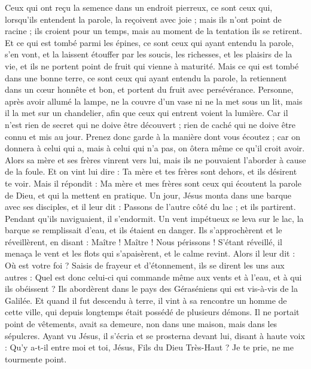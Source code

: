 \begin{multicols}{2}
Ceux qui ont reçu la semence dans un endroit pierreux, ce sont ceux qui, lorsqu’ils entendent la parole, la reçoivent avec joie ; mais ils n'ont point de racine ; ils croient pour un temps, mais au moment de la tentation ils se retirent.
Et ce qui est tombé parmi les épines, ce sont ceux qui ayant entendu la parole, s'en vont, et la laissent étouffer par les soucis, les richesses, et les plaisirs de la vie, et ils ne portent point de fruit qui vienne à maturité.
Mais ce qui est tombé dans une bonne terre, ce sont ceux qui ayant entendu la parole, la retiennent dans un cœur honnête et bon, et portent du fruit avec persévérance.
Personne, après avoir allumé la lampe, ne la couvre d'un vase ni ne la met sous un lit, mais il la met sur un chandelier, afin que ceux qui entrent voient la lumière.
Car il n’est rien de secret qui ne doive être découvert ; rien de caché qui ne doive être connu et mis au jour.
Prenez donc garde à la manière dont vous écoutez ; car on donnera à celui qui a, mais à celui qui n’a pas, on ôtera même ce qu’il croit avoir.
Alors sa mère et ses frères vinrent vers lui, mais ils ne pouvaient l'aborder à cause de la foule.
Et on vint lui dire : Ta mère et tes frères sont dehors, et ils désirent te voir.
Mais il répondit : Ma mère et mes frères sont ceux qui écoutent la parole de Dieu, et qui la mettent en pratique.
Un jour, Jésus monta dans une barque avec ses disciples, et il leur dit : Passons de l'autre côté du lac ; et ils partirent.
Pendant qu’ils naviguaient, il s'endormit. Un vent impétueux se leva sur le lac, la barque se remplissait d'eau, et ils étaient en danger.
Ils s’approchèrent et le réveillèrent, en disant : Maître ! Maître ! Nous périssons ! S’étant réveillé, il menaça le vent et les flots qui s'apaisèrent, et le calme revint.
Alors il leur dit : Où est votre foi ? Saisis de frayeur et d’étonnement, ils se dirent les uns aux autres : Quel est donc celui-ci qui commande même aux vents et à l'eau, et à qui ils obéissent ?
Ils abordèrent dans le pays des Géraséniens qui est vis-à-vis de la Galilée.
Et quand il fut descendu à terre, il vint à sa rencontre un homme de cette ville, qui depuis longtemps était possédé de plusieurs démons. Il ne portait point de vêtements, avait sa demeure, non dans une maison, mais dans les sépulcres.
Ayant vu Jésus, il s'écria et se prosterna devant lui, disant à haute voix : Qu'y a-t-il entre moi et toi, Jésus, Fils du Dieu Très-Haut ? Je te prie, ne me tourmente point.

\end{multicols}
